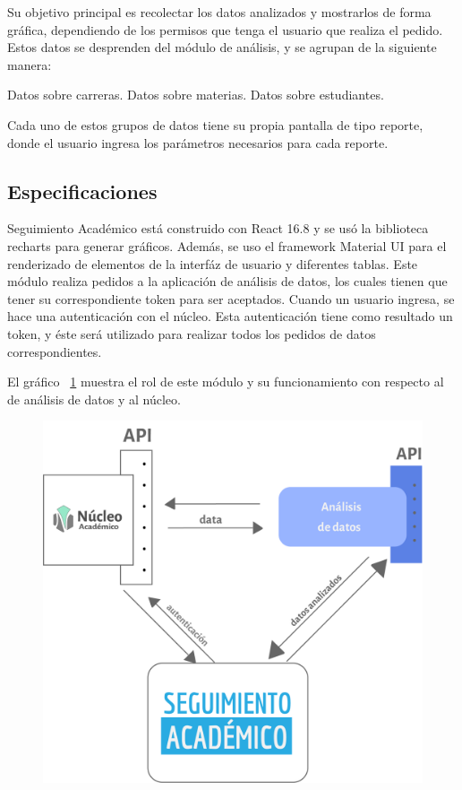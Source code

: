 Su objetivo principal es recolectar los datos analizados y mostrarlos de forma gráfica, dependiendo de los permisos que tenga el usuario que realiza el pedido.
Estos datos se desprenden del módulo de análisis, y se agrupan de la siguiente manera:

\begin{outline}
\2 Datos sobre carreras.
\2 Datos sobre materias.
\2 Datos sobre estudiantes.
\end{outline}

Cada uno de estos grupos de datos tiene su propia pantalla de tipo reporte, donde el usuario ingresa los parámetros necesarios para cada reporte.


\subsection{Especificaciones}

Seguimiento Académico está construido con React 16.8 y se usó la biblioteca recharts para generar gráficos. Además, se uso el framework Material UI para el renderizado de elementos de la interfáz de usuario y diferentes tablas.
Este módulo realiza pedidos a la aplicación de análisis de datos, los cuales tienen que tener su correspondiente token para ser aceptados.
Cuando un usuario ingresa, se hace una autenticación con el núcleo. Esta autenticación tiene como resultado un token, y éste será utilizado para realizar todos los pedidos de datos correspondientes.

El gráfico ~\ref{fig:analisis-datos} muestra el rol de este módulo y su funcionamiento con respecto al de análisis de datos y al núcleo.

\begin{figure}[H]
  \centering
    \includegraphics[scale=0.8]{images/seguimiento-academico/flow-seguimiento-academico.png}
  \label{fig:analisis-datos}
\end{figure}

